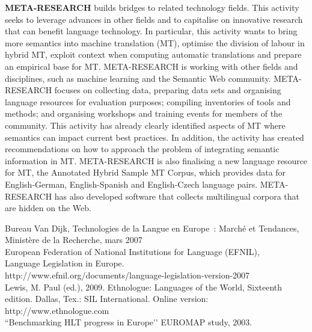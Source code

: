 \begin{multicols}{2}
\textbf{META-RESEARCH} builds bridges to related technology fields. This activity seeks to leverage advances in other fields and to capitalise on innovative research that can benefit language technology. In particular, this activity wants to bring more semantics into machine translation (MT), optimise the division of labour in hybrid MT, exploit context when computing automatic translations and prepare an empirical base for MT. META-RESEARCH is working with other fields and disciplines, such as machine learning and the Semantic Web community. META-RESEARCH focuses on collecting data, preparing data sets and organising language resources for evaluation purposes; compiling inventories of tools and methods; and organising workshops and training events for members of the community. This activity has already clearly identified aspects of MT where semantics can impact current best practices. In addition, the activity has created recommendations on how to approach the problem of integrating semantic information in MT. META-RESEARCH is also finalising a new language resource for MT, the Annotated Hybrid Sample MT Corpus, which provides data for English-German, English-Spanish and English-Czech language pairs. META-RESEARCH has also developed software that collects multilingual corpora that are hidden on the Web.
\end{multicols}

\cleardoublepage

\appendix
{}


Bureau Van Dijk, Technologies de la Langue en Europe : Marché et Tendances, Ministère de la Recherche, mars 2007\\


European Federation of National Institutions for Language (EFNIL),\\
Language Legislation in Europe.\\
http://www.efnil.org/documents/language-legislation-version-2007\\


Lewis, M. Paul (ed.), 2009. Ethnologue: Languages of the World, Sixteenth edition. Dallas, Tex.: SIL International. Online version: http://www.ethnologue.com\\


``Benchmarking HLT progress in Europe{\mbox '}{\mbox '} EUROMAP study, 2003.
\\

